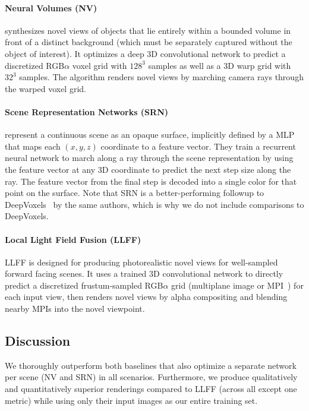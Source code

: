 \documentclass[runningheads]{llncs}
\begin{document}
\paragraph{\textbf{Neural Volumes (NV)}~\cite{neuralvolumes}}
synthesizes novel views of objects that lie entirely within a bounded volume in front of a distinct background (which must be separately captured without the object of interest). It optimizes a deep 3D convolutional network to predict a discretized RGB$\alpha$ voxel grid with $128^3$ samples as well as a 3D warp grid with $32^3$ samples. The algorithm renders novel views by marching camera rays through the warped voxel grid. 

\paragraph{\textbf{Scene Representation Networks (SRN)}~\cite{srn}}
represent a continuous scene as an opaque surface, implicitly defined by a MLP that maps each $(x,y,z)$ coordinate to a feature vector. They train a recurrent neural network to march along a ray through the scene representation by using the feature vector at any 3D coordinate to predict the next step size along the ray. The feature vector from the final step is decoded into a single color for that point on the surface. Note that SRN is a better-performing followup to DeepVoxels~\cite{deepvoxels} by the same authors, which is why we do not include comparisons to DeepVoxels.

\paragraph{\textbf{Local Light Field Fusion (LLFF)}~\cite{mildenhall19}}
LLFF is designed for producing photorealistic novel views for well-sampled forward facing scenes. It uses a trained 3D convolutional network to directly predict a discretized frustum-sampled RGB$\alpha$ grid (multiplane image or MPI~\cite{zhou18}) for each input view, then renders novel views by alpha compositing and blending nearby MPIs into the novel viewpoint. 


\subsection{Discussion}

We thoroughly outperform both baselines that also optimize a separate network per scene (NV and SRN) in all scenarios.
Furthermore, we produce qualitatively and quantitatively superior renderings compared to LLFF (across all except one metric) while using only their input images as our entire training set.
\end{document}
